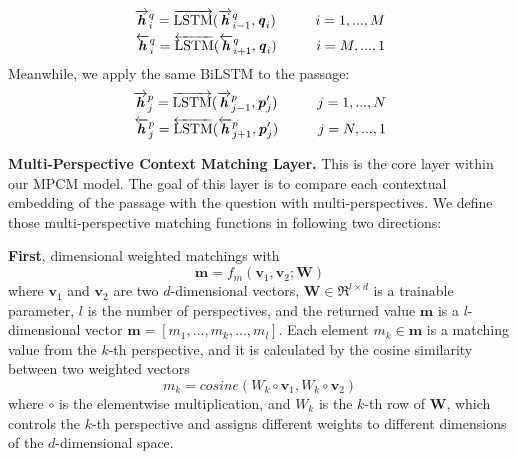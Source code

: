 \documentclass[11pt,letterpaper]{article}
\begin{document}
\begin{equation}
\begin{split}
\overrightarrow{\textbf{\emph{h}}}_i^q=\overrightarrow{\text{LSTM}}(\overrightarrow{\textbf{\emph{h}}}_{i-1}^q,\textbf{\emph{q}}_i) \hspace{10mm} i=1,...,M \\
\overleftarrow{\textbf{\emph{h}}}_i^q=\overleftarrow{\text{LSTM}}(\overleftarrow{\textbf{\emph{h}}}_{i+1}^q,\textbf{\emph{q}}_i) \hspace{10mm} i=M,...,1
\label{equ:biLSTM}
\end{split}
\end{equation}
Meanwhile, we apply the same BiLSTM to the passage:
\begin{equation}
\begin{split}
\overrightarrow{\textbf{\emph{h}}}_j^p=\overrightarrow{\text{LSTM}}(\overrightarrow{\textbf{\emph{h}}}_{j-1}^p,\textbf{\emph{p}}^{\prime}_j) \hspace{10mm} j=1,...,N \\
\overleftarrow{\textbf{\emph{h}}}_j^p=\overleftarrow{\text{LSTM}}(\overleftarrow{\textbf{\emph{h}}}_{j+1}^p,\textbf{\emph{p}}^{\prime}_j) \hspace{10mm} j=N,...,1
\label{equ:biLSTM2}
\end{split}
\end{equation}
 
\textbf{Multi-Perspective Context Matching Layer.} 
This is the core layer within our MPCM model. 
The goal of this layer is to compare each contextual embedding of the passage with the question with multi-perspectives.
We define those multi-perspective matching functions in following two directions:

\textbf{First}, dimensional weighted matchings with
\begin{equation}
\bm{m} = f_{m}(\bm{v}_1,\bm{v}_2;\bm{W})
\label{equ:MP_cosine}
\end{equation}
where $\bm{v}_1$ and $\bm{v}_2$ are two $d$-dimensional vectors, $\bm{W} \in \Re^{l \times d}$ is a trainable parameter, $l$ is the number of perspectives, and the returned value $\bm{m}$ is a $l$-dimensional vector $\bm{m}=[m_1,...,m_k,...,m_l]$. Each element $m_k \in \bm{m}$ is a matching value from the $k$-th perspective, and it is calculated by the cosine similarity between two weighted vectors
\begin{equation}
m_k=cosine(W_k \circ \bm{v}_1, W_k \circ \bm{v}_2)
\label{equ:weight_cosine}
\end{equation}
where $\circ$ is the elementwise multiplication, and $W_k$ is the $k$-th row of $\bm{W}$, which controls the $k$-th perspective and assigns different weights to different dimensions of the $d$-dimensional space.
\end{document}
